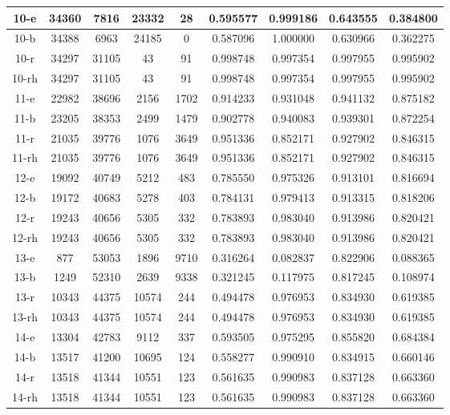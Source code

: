 \begin{longtable}[!h]{|c|c|c|c|c|c|c|c|c|}
	\hline	10-e	&	34360	&	7816	&	23332	&	28	&	0.595577	&	0.999186	&	0.643555	&	0.384800	\\
	\hline \rowcolor{bad}	10-b	&	34388	&	6963	&	24185	&	0	&	0.587096	&	1.000000	&	0.630966	&	0.362275	\\
	\hline \rowcolor{closest}	10-r	&	34297	&	31105	&	43	&	91	&	0.998748	&	0.997354	&	0.997955	&	0.995902	\\
	\hline \rowcolor{closest}	10-rh	&	34297	&	31105	&	43	&	91	&	0.998748	&	0.997354	&	0.997955	&	0.995902	\\
	
	\hline \rowcolor{closest}	11-e	&	22982	&	38696	&	2156	&	1702	&	0.914233	&	0.931048	&	0.941132	&	0.875182	\\
	\hline	11-b	&	23205	&	38353	&	2499	&	1479	&	0.902778	&	0.940083	&	0.939301	&	0.872254	\\
	\hline \rowcolor{bad}	11-r	&	21035	&	39776	&	1076	&	3649	&	0.951336	&	0.852171	&	0.927902	&	0.846315	\\
	\hline \rowcolor{bad}	11-rh	&	21035	&	39776	&	1076	&	3649	&	0.951336	&	0.852171	&	0.927902	&	0.846315	\\
	
	\hline \rowcolor{bad}	12-e	&	19092	&	40749	&	5212	&	483	&	0.785550	&	0.975326	&	0.913101	&	0.816694	\\
	\hline	12-b	&	19172	&	40683	&	5278	&	403	&	0.784131	&	0.979413	&	0.913315	&	0.818206	\\
	\hline \rowcolor{closest}	12-r	&	19243	&	40656	&	5305	&	332	&	0.783893	&	0.983040	&	0.913986	&	0.820421	\\
	\hline \rowcolor{closest}	12-rh	&	19243	&	40656	&	5305	&	332	&	0.783893	&	0.983040	&	0.913986	&	0.820421	\\
	
	\hline \rowcolor{bad}	13-e	&	877	&	53053	&	1896	&	9710	&	0.316264	&	0.082837	&	0.822906	&	0.088365	\\
	\hline	13-b	&	1249	&	52310	&	2639	&	9338	&	0.321245	&	0.117975	&	0.817245	&	0.108974	\\
	\hline \rowcolor{closest}	13-r	&	10343	&	44375	&	10574	&	244	&	0.494478	&	0.976953	&	0.834930	&	0.619385	\\
	\hline \rowcolor{closest}	13-rh	&	10343	&	44375	&	10574	&	244	&	0.494478	&	0.976953	&	0.834930	&	0.619385	\\
	
	\hline \rowcolor{closest}	14-e	&	13304	&	42783	&	9112	&	337	&	0.593505	&	0.975295	&	0.855820	&	0.684384	\\
	\hline \rowcolor{bad}	14-b	&	13517	&	41200	&	10695	&	124	&	0.558277	&	0.990910	&	0.834915	&	0.660146	\\
	\hline	14-r	&	13518	&	41344	&	10551	&	123	&	0.561635	&	0.990983	&	0.837128	&	0.663360	\\
	\hline	14-rh	&	13518	&	41344	&	10551	&	123	&	0.561635	&	0.990983	&	0.837128	&	0.663360	\\
	

\end{longtable}
